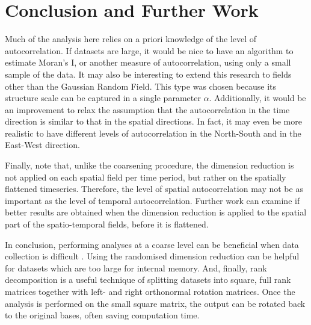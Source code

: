 \documentclass[sigconf]{acmart}
\begin{document}
\section{Conclusion and Further Work}
\label{sec:Conclusion and Further Work}

Much of the analysis here relies on a priori knowledge of the level of autocorrelation. If datasets are large, it would be nice to have an algorithm to estimate Moran's I, or another measure of autocorrelation, using only a small sample of the data. It may also be interesting to extend this research to fields other than the Gaussian Random Field. This type was chosen because its structure scale can be captured in a single parameter $\alpha$. Additionally, it would be an improvement to relax the assumption that the autocorrelation in the time direction is similar to that in the spatial directions. In fact, it may even be more realistic to have different levels of autocorrelation in the North-South and in the East-West direction.

Finally, note that, unlike the coarsening procedure, the dimension reduction is not applied on each spatial field per time period, but rather on the spatially flattened timeseries. Therefore, the level of spatial autocorrelation may not be as important as the level of temporal autocorrelation. Further work can examine if better results are obtained when the dimension reduction is applied to the spatial part of the spatio-temporal fields, before it is flattened.

In conclusion, performing analyses at a coarse level can be beneficial when data collection is difficult%
. Using the randomised dimension reduction can be helpful for datasets which are too large for internal memory. And, finally, rank decomposition is a useful technique of splitting datasets into square, full rank matrices together with left- and right orthonormal rotation matrices. Once the analysis is performed on the small square matrix, the output can be rotated back to the original bases, often saving computation time.



\end{document}
